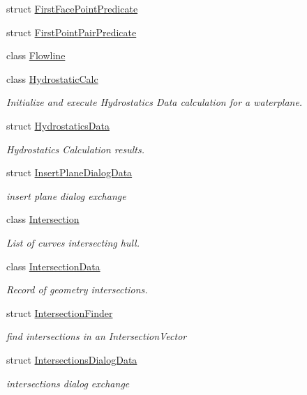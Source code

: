 \begin{DoxyCompactItemize}
\item 
struct \hyperlink{structShipCAD_1_1FirstFacePointPredicate}{First\+Face\+Point\+Predicate}
\item 
struct \hyperlink{structShipCAD_1_1FirstPointPairPredicate}{First\+Point\+Pair\+Predicate}
\item 
class \hyperlink{classShipCAD_1_1Flowline}{Flowline}
\item 
class \hyperlink{classShipCAD_1_1HydrostaticCalc}{Hydrostatic\+Calc}
\begin{DoxyCompactList}\small\item\em Initialize and execute Hydrostatics Data calculation for a waterplane. \end{DoxyCompactList}\item 
struct \hyperlink{structShipCAD_1_1HydrostaticsData}{Hydrostatics\+Data}
\begin{DoxyCompactList}\small\item\em Hydrostatics Calculation results. \end{DoxyCompactList}\item 
struct \hyperlink{structShipCAD_1_1InsertPlaneDialogData}{Insert\+Plane\+Dialog\+Data}
\begin{DoxyCompactList}\small\item\em insert plane dialog exchange \end{DoxyCompactList}\item 
class \hyperlink{classShipCAD_1_1Intersection}{Intersection}
\begin{DoxyCompactList}\small\item\em List of curves intersecting hull. \end{DoxyCompactList}\item 
class \hyperlink{classShipCAD_1_1IntersectionData}{Intersection\+Data}
\begin{DoxyCompactList}\small\item\em Record of geometry intersections. \end{DoxyCompactList}\item 
struct \hyperlink{structShipCAD_1_1IntersectionFinder}{Intersection\+Finder}
\begin{DoxyCompactList}\small\item\em find intersections in an Intersection\+Vector \end{DoxyCompactList}\item 
struct \hyperlink{structShipCAD_1_1IntersectionsDialogData}{Intersections\+Dialog\+Data}
\begin{DoxyCompactList}\small\item\em intersections dialog exchange \end{DoxyCompactList}\item 

\end{DoxyCompactItemize}
